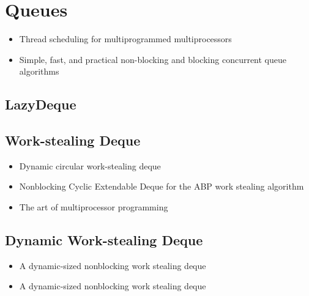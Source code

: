 
\chapter{Queues}
\label{chap:queues-implementation}

\begin{itemize}
\item Thread scheduling for multiprogrammed multiprocessors
  \cite{Arora2001}
\item Simple, fast, and practical non-blocking and blocking concurrent
  queue algorithms \cite{Michael1996}
\end{itemize}

\section{LazyDeque}
\label{sec:queues-implementation-lazy-deque}



\section{Work-stealing Deque}
\label{sec:queues-implementation-ws-deque}

\begin{itemize}
\item Dynamic circular work-stealing deque \cite{Chase2005}
\item Nonblocking Cyclic Extendable Deque for the ABP work stealing
  algorithm \cite{Lev2005}
\item The art of multiprocessor programming \cite{Herlihy2008}
\end{itemize}



\section{Dynamic Work-stealing Deque}
\label{sec:queues-implementation-dynamic-ws-deque}

\begin{itemize}
\item A dynamic-sized nonblocking work stealing deque
  \cite{Hendler2006}
\item A dynamic-sized nonblocking work stealing deque
  \cite{Hendler2006a}
\end{itemize}

